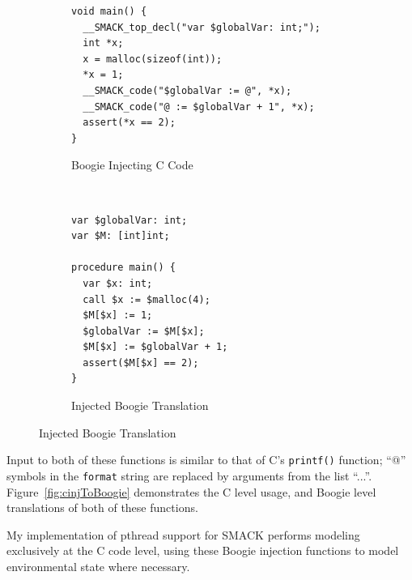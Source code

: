 \begin{figure}[h]
\centering
\caption{Injecting Boogie Code from C}\label{fig:cinjToBoogie}
\begin{subfigure}[b]{1\textwidth}
\centering
\caption{Boogie Injecting C Code}\label{fig:cinjToBoogie_a}
\begin{lstlisting}
void main() {
  __SMACK_top_decl("var $globalVar: int;");
  int *x;
  x = malloc(sizeof(int));
  *x = 1;
  __SMACK_code("$globalVar := @", *x);
  __SMACK_code("@ := $globalVar + 1", *x);
  assert(*x == 2);
}
\end{lstlisting}
\end{subfigure}
~
\begin{subfigure}[b]{1\textwidth}
\centering
\caption{Injected Boogie Translation}\label{fig:cinjToBoogie_b}
\begin{lstlisting}[language=boogie]
var $globalVar: int;
var $M: [int]int;

procedure main() {
  var $x: int;
  call $x := $malloc(4);
  $M[$x] := 1;
  $globalVar := $M[$x];
  $M[$x] := $globalVar + 1;
  assert($M[$x] == 2);
}
\end{lstlisting}
\end{subfigure}
\end{figure}

Input to both of these functions is similar to that of C's
\lstinline|printf()| function; ``@'' symbols in the
\lstinline|format| string are replaced by arguments from the list
``...''.  Figure~\ref{fig:cinjToBoogie} demonstrates the C level usage,
and Boogie level translations of both of these functions.

My implementation of pthread support for SMACK performs modeling
exclusively at the C code level, using these Boogie injection
functions to model environmental state where necessary.

